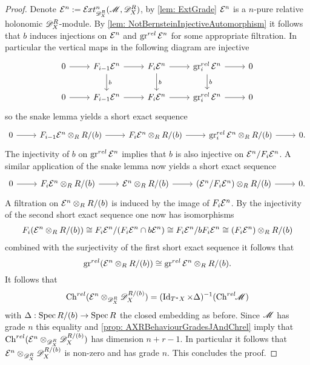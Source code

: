 \begin{proof}
  Denote $\E^n := \Ex{\D_X^R}{n}(\M,\D_X^R)$, by \cref{lem: ExtGrade} $\mathcal{E}^n$ is a $n$-pure relative holonomic $\mathscr{D}_X^R$-module.
  By \cref{lem: NotBernsteinInjectiveAutomorphism} it follows that $b$ induces injections on $\mathcal{E}^{n}$ and $\operatorname{gr}^{rel} \mathcal{E}^{n}$ for some appropriate filtration.
  In particular the vertical maps in the following diagram are injective
  $$\begin{tikzcd}
    0 \arrow{r} & F_{i-1} \E^n\arrow{r} \arrow{d}{b}& F_i \E^{n}\arrow{r} \arrow{d}{b}& \gr^{rel}_i \E^n\arrow{r}\arrow{d}{b} & 0\\
    0 \arrow{r} & F_{i-1} \E^n\arrow{r} & F_i \E^{n}\arrow{r} & \gr^{rel}_i \E^n\arrow{r} & 0
  \end{tikzcd} $$
  so the snake lemma yields a short exact sequence
  $$\begin{tikzcd}
    0 \arrow{r} & F_{i-1} \E^n\otimes_R R/(b)\arrow{r} & F_i \E^{n}\otimes_R R/(b)\arrow{r} & \gr^{rel}_i \E^n\arrow{r}\otimes_R R/(b) & 0.
  \end{tikzcd} $$
  The injectivity of $b$ on $\operatorname{gr}^{rel}\mathcal{E}^n$ implies that $b$ is also injective on $\mathcal{E}^n/F_i\mathcal{E}^n$. A similar application of the snake lemma now yields a short exact sequence
  $$\begin{tikzcd}
    0 \arrow{r} & F_{i} \E^n\otimes_R R/(b)\arrow{r} & \E^{n}\otimes_R R/(b)\arrow{r} & (\E^n/F_i \E^n )\arrow{r}\otimes_R R/(b) & 0.
  \end{tikzcd} $$
  A filtration on $\mathcal{E}^n \otimes_R R/(b)$ is induced by the image of $F_i\mathcal{E}^n$. By the injectivity of the second short exact sequence one now has isomorphisms
  \begin{align*}
    F_i(\mathcal{E}^n \otimes_R R/(b)) \cong F_i\mathcal{E}^n / (F_i \mathcal{E}^n \cap b\mathcal{E}^n) \cong F_i \mathcal{E}^n / b F_i \mathcal{E}^n \cong  (F_i\mathcal{E}^n) \otimes_R R/(b)
  \end{align*}
  combined with the surjectivity of the first short exact sequence it follows that
  $$\operatorname{gr}^{rel}(\mathcal{E}^n \otimes_R R/(b)) \cong \operatorname{gr}^{rel}\mathcal{E}^n \otimes_R R/(b). $$
  It follows that
  $$\operatorname{Ch}^{rel}(\mathcal{E}^n \otimes_{\mathscr{D}_X^R} \mathscr{D}_X^{R/(b)})  = (\operatorname{Id}_{T^*X} \times \Delta)^{-1}(\operatorname{Ch}^{rel}\mkern-5mu \mathscr{M})$$
  with $\Delta: \operatorname{Spec} R/(b) \to \operatorname{Spec} R$ the closed embedding as before.
  Since $\mathscr{M}$ has grade $n$ this equality and \cref{prop: AXRBehaviourGradesJAndChrel} imply that $\operatorname{Ch}^{rel}(\mathcal{E}^n \otimes_{\mathscr{D}_X^R} \mathscr{D}_X^{R/(b)})$ has dimension $n + r - 1$.
  In particular it follows that $\mathcal{E}^n \otimes_{\mathscr{D}_X^R} \mathscr{D}_X^{R/(b)}$ is non-zero and has grade $n$. This concludes the proof.
\end{proof}
